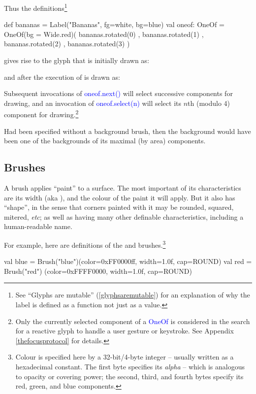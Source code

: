 \documentclass[12pt,a4paper]{article}
\def\Scala#1{\textcolor{blue}{\textsf{#1}}}
\def\SS#1{\subsection{#1}}
\begin{document}
Thus the definitions\footnote{See ``Glyphs are mutable'' (\ref {glyphsaremutable}) for an explanation
of why the label is defined as a function not just as a value.}
\begin{scala}
  def bananas = Label("Bananas", fg=white, bg=blue)
  val oneof: OneOf =
      OneOf(bg = Wide.red)( bananas.rotated(0)
                          , bananas.rotated(1)
                          , bananas.rotated(2)
                          , bananas.rotated(3)
                          )
 \end{scala}
gives rise to the glyph that is initially drawn as:
\begin{center}
\end{center}

and after the execution of  is drawn as:
\begin{center}
\end{center}

Subsequent invocations of \Scala{oneof.next()} will select successive components
for drawing, and an invocation of \Scala{oneof.select(n)} will select its $n$th (modulo 4)
component for drawing.\footnote{Only the currently selected component of a
\Scala{OneOf} is considered in the search for a reactive glyph to handle
a user gesture or keystroke. See Appendix \ref{thefocusprotocol} for details.} 

Had  been specified without a background brush, then
the background would have been one of the backgrounds of its
maximal (by area) components.
\begin{center}
\end{center}


\clearpage
\SS{Brushes}
A brush applies ``paint'' to a surface. The
most important of its characteristics are its width (aka ), and
the colour of the paint it will apply. But it also has ``shape'', in the sense that
corners painted with it may be rounded, squared, mitered,
\textit{etc}; as well as having many other definable
characteristics, including a human-readable name.

For example, here are definitions of the  and  brushes.\footnote{Colour
is specified here by a 32-bit/4-byte integer -- usually written as a hexadecimal
constant. The first byte specifies its
\textit{alpha} -- which is analogous to opacity or covering power; the second, third, and fourth bytes
specify its red, green, and blue components.} 
\begin{scala}
  val blue = Brush("blue")(color=0xFF0000ff,  width=1.0f, cap=ROUND)
  val red  = Brush("red") (color=0xFFFF0000,  width=1.0f, cap=ROUND)
\end{scala}
\end{document}
